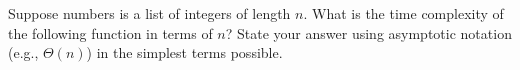 
\begin{prob}

    Suppose numbers is a list of integers of length $n$. What is the time complexity of the following function in terms of $n$?
    State your answer using asymptotic notation (e.g., $\Theta(n)$) in the simplest
    terms possible.

    \inputminted{python}{code.py}

\end{prob}
